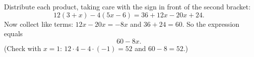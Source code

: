 Distribute each product, taking care with the sign in front of the second bracket:
\[
12(3+x)-4(5x-6)=36+12x-20x+24 .
\]
Now collect like terms: $12x-20x=-8x$ and $36+24=60$. So the expression equals
\[
\boxed{60-8x}.
\]
(Check with $x=1$: $12\cdot4-4\cdot(-1)=52$ and $60-8=52$.)
